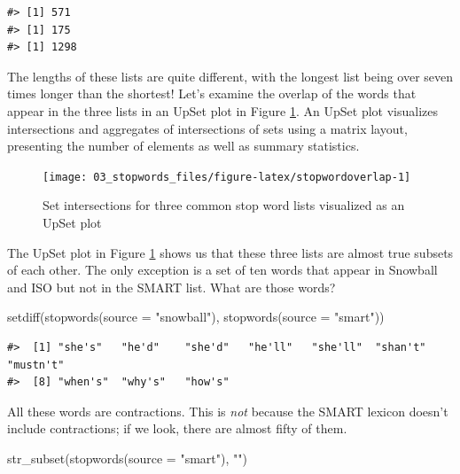 \documentclass[
]{krantz}
\makeatletter
\newenvironment{Shaded}{\begin{snugshade}}{\end{snugshade}}
\newcommand{\AttributeTok}[1]{\textcolor[rgb]{0.77,0.63,0.00}{#1}}
\newcommand{\FunctionTok}[1]{\textcolor[rgb]{0.00,0.00,0.00}{#1}}
\newcommand{\NormalTok}[1]{#1}
\newcommand{\StringTok}[1]{\textcolor[rgb]{0.31,0.60,0.02}{#1}}
\newenvironment{kframe}{%
\medskip{}
\setlength{\fboxsep}{.8em}
 \def\at@end@of@kframe{}%
 \ifinner\ifhmode%
  \def\at@end@of@kframe{\end{minipage}}%
  \begin{minipage}{\columnwidth}%
 \fi\fi%
 \def\FrameCommand##1{\hskip\@totalleftmargin \hskip-\fboxsep
 \colorbox{shadecolor}{##1}\hskip-\fboxsep
     \hskip-\linewidth \hskip-\@totalleftmargin \hskip\columnwidth}%
 \MakeFramed {\advance\hsize-\width
   \@totalleftmargin\z@ \linewidth\hsize
   \@setminipage}}%
 {\par\unskip\endMakeFramed%
 \at@end@of@kframe}
\renewenvironment{Shaded}{\begin{kframe}}{\end{kframe}}
\makeatother
\begin{document}
\begin{verbatim}
#> [1] 571
#> [1] 175
#> [1] 1298
\end{verbatim}

The lengths of these lists are quite different, with the longest list being over seven times longer than the shortest! Let's examine the overlap of the words that appear in the three lists in an UpSet plot in Figure \ref{fig:stopwordoverlap}. An UpSet plot \citep{Lex2014} visualizes intersections and aggregates of intersections of sets using a matrix layout, presenting the number of elements as well as summary statistics.


\begin{figure}

{\centering \texttt{[image: 03\_stopwords\_files/figure-latex/stopwordoverlap-1]} 

}

\caption{Set intersections for three common stop word lists visualized as an UpSet plot}\label{fig:stopwordoverlap}
\end{figure}

The UpSet plot in Figure \ref{fig:stopwordoverlap} shows us that these three lists are almost true subsets of each other. The only exception is a set of ten words that appear in Snowball and ISO but not in the SMART list. What are those words?

\begin{Shaded}
\begin{Highlighting}[]
\FunctionTok{setdiff}\NormalTok{(}\FunctionTok{stopwords}\NormalTok{(}\AttributeTok{source =} \StringTok{"snowball"}\NormalTok{),}
        \FunctionTok{stopwords}\NormalTok{(}\AttributeTok{source =} \StringTok{"smart"}\NormalTok{))}
\end{Highlighting}
\end{Shaded}

\begin{verbatim}
#>  [1] "she's"   "he'd"    "she'd"   "he'll"   "she'll"  "shan't"  "mustn't"
#>  [8] "when's"  "why's"   "how's"
\end{verbatim}

All these words are contractions. This is \emph{not} because the SMART lexicon doesn't include contractions; if we look, there are almost fifty of them.

\begin{Shaded}
\begin{Highlighting}[]
\FunctionTok{str\_subset}\NormalTok{(}\FunctionTok{stopwords}\NormalTok{(}\AttributeTok{source =} \StringTok{"smart"}\NormalTok{), }\StringTok{"\textquotesingle{}"}\NormalTok{)}
\end{Highlighting}
\end{Shaded}
\end{document}
